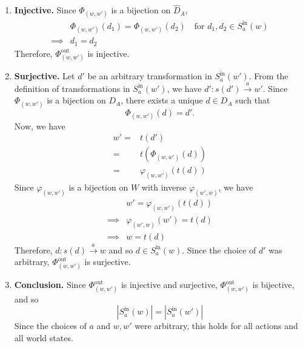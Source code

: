 \begin{proofE}
\begin{enumerate}[(1)]
\begin{enumerate}
        \item \textbf{Injective.}
        Since $\Phi_{(w, w')}$ is a bijection on $\hat{D}_{A}$,
        \begin{align}
            & \Phi_{(w, w')}(d_{1}) = \Phi_{(w, w')}(d_{2}) \quad \text{for $d_{1}, d_{2} \in S_{a}^{\text{in}}(w)$} \\
            \implies & d_{1} = d_{2}
        \end{align}
        Therefore, $\Phi_{(w, w')}^{\text{out}}$ is injective.

        \item \textbf{Surjective.}
        Let $d'$ be an arbitrary transformation in $S_{a}^{\text{in}}(w')$.
        From the definition of transformations in $S_{a}^{\text{in}}(w')$, we have $d': s(d') \xrightarrow{a} w'$.
        Since $\Phi_{(w, w')}$ is a bijection on $D_{A}$, there exists a unique $d \in D_{A}$ such that
        \begin{equation}
            \Phi_{(w, w')}(d) = d'.
        \end{equation}
        Now, we have
        \begin{align}
            w' = & t(d') \\
            = & t(\Phi_{(w, w')}(d)) \\
            = & \varphi_{(w, w')}(t(d))
        \end{align}
        Since $\varphi_{(w, w')}$ is a bijection on $W$ with inverse $\varphi_{(w', w)}$, we have
        \begin{align}
            & w' = \varphi_{(w, w')}(t(d)) \\
            \implies & \varphi_{(w', w)}(w') = t(d) \\
            \implies & w = t(d)
        \end{align}
        Therefore, $d: s(d) \xrightarrow{a} w$ and so $d \in S_{a}^{\text{in}}(w)$.
        Since the choice of $d'$ was arbitrary, $\Phi_{(w, w')}^{\text{out}}$ is surjective.

        \item \textbf{Conclusion.}
        Since $\Phi_{(w, w')}^{\text{out}}$ is injective and surjective, $\Phi_{(w, w')}^{\text{out}}$ is bijective, and so
        \begin{equation}
            |S_{a}^{\text{in}}(w)| = |S_{a}^{\text{in}}(w')|
        \end{equation}
        Since the choices of $a$ and $w, w'$ were arbitrary, this holds for all actions and all world states.
    \end{enumerate}
\end{enumerate}
\end{proofE}

